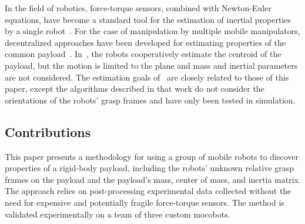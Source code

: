 \documentclass[letterpaper, 10 pt, journal, twoside]{IEEEtran}
\begin{document}
In the field of robotics, force-torque sensors, combined with Newton-Euler equations, have become a standard tool for the estimation of inertial properties by a single robot~\cite{atkeson1986estimation}. For the case of manipulation by multiple mobile manipulators, decentralized approaches have been developed for estimating properties of the common payload~\cite{habibi2015distributed,marino2018}. %
In~\cite{habibi2015distributed}, the robots cooperatively estimate the centroid of the payload, but the motion is limited to the plane and mass and inertial parameters are not considered. The estimation goals of~\cite{marino2018} are closely related to those of this paper, except the algorithms described in that work do not consider the orientations of the robots' grasp frames and have only been tested in simulation.



\subsection{Contributions}
This paper presents a methodology for using a group of mobile robots to discover properties of a rigid-body payload, including the robots' unknown relative grasp frames on the payload and the payload's mass, center of mass, and inertia matrix. The approach relies on post-processing experimental data collected without the need for  expensive and potentially fragile force-torque sensors. The method is validated experimentally on a team of three custom mocobots.
\end{document}

